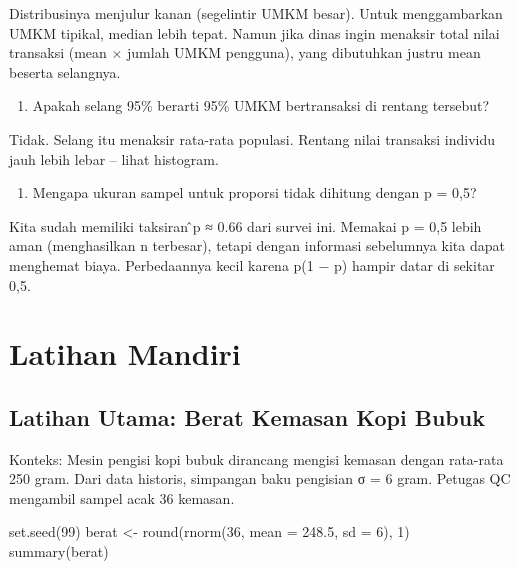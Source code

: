 \documentclass[
  indonesian,
  letterpaper,
]{book}
\newenvironment{Shaded}{\begin{snugshade}}{\end{snugshade}}
\newcommand{\AttributeTok}[1]{\textcolor[rgb]{0.40,0.45,0.13}{#1}}
\newcommand{\DecValTok}[1]{\textcolor[rgb]{0.68,0.00,0.00}{#1}}
\newcommand{\FloatTok}[1]{\textcolor[rgb]{0.68,0.00,0.00}{#1}}
\newcommand{\FunctionTok}[1]{\textcolor[rgb]{0.28,0.35,0.67}{#1}}
\newcommand{\NormalTok}[1]{\textcolor[rgb]{0.00,0.23,0.31}{#1}}
\newcommand{\OtherTok}[1]{\textcolor[rgb]{0.00,0.23,0.31}{#1}}
\providecommand{\tightlist}{%
  \setlength{\itemsep}{0pt}\setlength{\parskip}{0pt}}
\begin{document}
Distribusinya menjulur kanan (segelintir UMKM besar). Untuk
menggambarkan UMKM tipikal, median lebih tepat. Namun jika dinas ingin
menaksir total nilai transaksi (mean × jumlah UMKM pengguna), yang
dibutuhkan justru mean beserta selangnya.

\begin{enumerate}
\def\labelenumi{\arabic{enumi}.}
\setcounter{enumi}{2}
\tightlist
\item
  Apakah selang 95\% berarti 95\% UMKM bertransaksi di rentang tersebut?
\end{enumerate}

Tidak. Selang itu menaksir rata-rata populasi. Rentang nilai transaksi
individu jauh lebih lebar -- lihat histogram.

\begin{enumerate}
\def\labelenumi{\arabic{enumi}.}
\setcounter{enumi}{3}
\tightlist
\item
  Mengapa ukuran sampel untuk proporsi tidak dihitung dengan p = 0,5?
\end{enumerate}

Kita sudah memiliki taksiran ̂p ≈ 0.66 dari survei ini. Memakai p = 0,5
lebih aman (menghasilkan n terbesar), tetapi dengan informasi sebelumnya
kita dapat menghemat biaya. Perbedaannya kecil karena p(1 − p) hampir
datar di sekitar 0,5.


\chapter{Latihan Mandiri}\label{latihan-mandiri}

\section{Latihan Utama: Berat Kemasan Kopi
Bubuk}\label{latihan-utama-berat-kemasan-kopi-bubuk}

Konteks: Mesin pengisi kopi bubuk dirancang mengisi kemasan dengan
rata-rata 250 gram. Dari data historis, simpangan baku pengisian σ = 6
gram. Petugas QC mengambil sampel acak 36 kemasan.

\begin{Shaded}
\begin{Highlighting}[]
\FunctionTok{set.seed}\NormalTok{(}\DecValTok{99}\NormalTok{)}
\NormalTok{berat }\OtherTok{\textless{}{-}} \FunctionTok{round}\NormalTok{(}\FunctionTok{rnorm}\NormalTok{(}\DecValTok{36}\NormalTok{, }\AttributeTok{mean =} \FloatTok{248.5}\NormalTok{, }\AttributeTok{sd =} \DecValTok{6}\NormalTok{), }\DecValTok{1}\NormalTok{)}
\FunctionTok{summary}\NormalTok{(berat)}
\end{Highlighting}
\end{Shaded}
\end{document}
